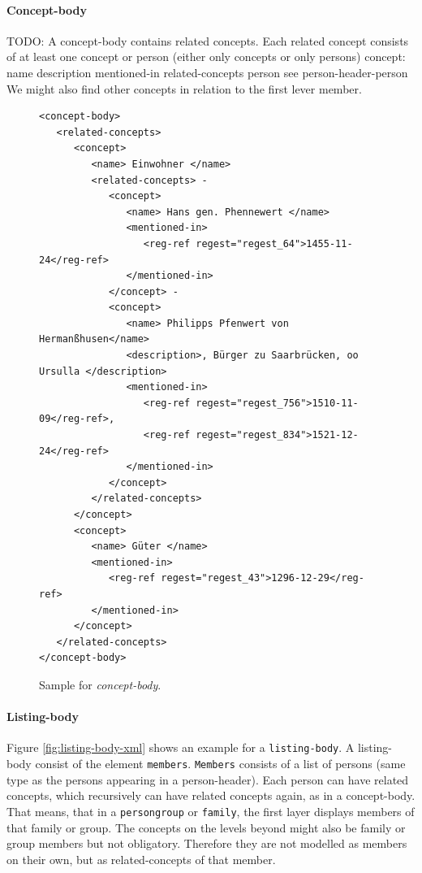 \paragraph{Concept-body}
TODO: A concept-body contains related concepts. Each related concept consists of at least one concept or person (either only concepts or only persons)
concept:
name
description
mentioned-in
related-concepts
person
see person-header-person
We might also find other concepts in relation to the first lever member.
\begin{figure}[H]
\centering
\begin{verbatim}
<concept-body>
   <related-concepts>
      <concept>
         <name> Einwohner </name>
         <related-concepts> -
            <concept>
               <name> Hans gen. Phennewert </name>
               <mentioned-in>
                  <reg-ref regest="regest_64">1455-11-24</reg-ref>
               </mentioned-in>
            </concept> -
            <concept>
               <name> Philipps Pfenwert von Hermanßhusen</name>
               <description>, Bürger zu Saarbrücken, oo Ursulla </description>
               <mentioned-in>
                  <reg-ref regest="regest_756">1510-11-09</reg-ref>, 
                  <reg-ref regest="regest_834">1521-12-24</reg-ref>
               </mentioned-in>
            </concept>
         </related-concepts>
      </concept>
      <concept>
         <name> Güter </name>
         <mentioned-in>
            <reg-ref regest="regest_43">1296-12-29</reg-ref>
         </mentioned-in>
      </concept>
   </related-concepts>
</concept-body>
\end{verbatim}
\label{fig:concept-body-xml}
\caption{Sample for \textit{concept-body}.}
\end{figure}

\paragraph{Listing-body}
Figure \ref{fig:listing-body-xml} shows an example for a \texttt{listing-body}. A listing-body consist of the element \texttt{members}. \texttt{Members} consists of a list of persons (same type as the persons appearing in a person-header). Each person can have related concepts, which recursively can have related concepts again, as in a concept-body.
That means, that in a \texttt{persongroup} or \texttt{family}, the first layer displays members of that family or group. The concepts on the levels beyond might also be family or group members but not obligatory. Therefore they are not modelled as members on their own, but as related-concepts of that member.


